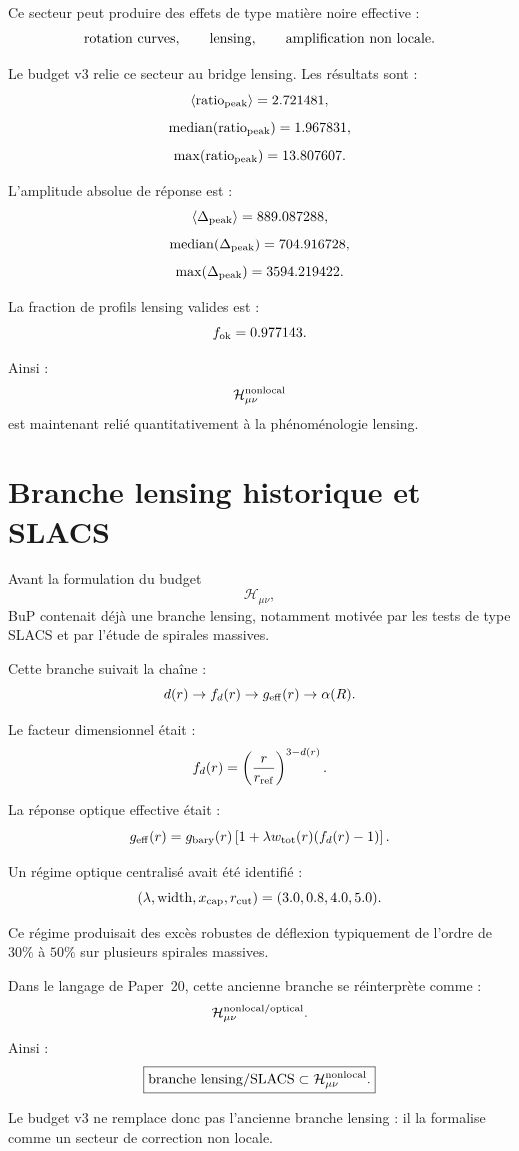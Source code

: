 \documentclass[11pt,a4paper]{article}
\begin{document}
Ce secteur peut produire des effets de type matière noire effective :
\[
{\rm rotation\ curves},
\qquad
{\rm lensing},
\qquad
{\rm amplification\ non\ locale}.
\]

Le budget v3 relie ce secteur au bridge lensing. Les résultats sont :
\[
\langle{\rm ratio}_{\rm peak}\rangle=2.721481,
\]
\[
{\rm median}({\rm ratio}_{\rm peak})=1.967831,
\]
\[
\max({\rm ratio}_{\rm peak})=13.807607.
\]

L'amplitude absolue de réponse est :
\[
\langle\Delta_{\rm peak}\rangle=889.087288,
\]
\[
{\rm median}(\Delta_{\rm peak})=704.916728,
\]
\[
\max(\Delta_{\rm peak})=3594.219422.
\]

La fraction de profils lensing valides est :
\[
f_{\rm ok}=0.977143.
\]

Ainsi :
\[
\mathcal{H}_{\mu\nu}^{\rm nonlocal}
\]
est maintenant relié quantitativement à la phénoménologie lensing.

\section{Branche lensing historique et SLACS}

Avant la formulation du budget
\[
\mathcal{H}_{\mu\nu},
\]
BuP contenait déjà une branche lensing, notamment motivée par les tests de
type SLACS et par l'étude de spirales massives.

Cette branche suivait la chaîne :
\[
d(r)
\to
f_d(r)
\to
g_{\rm eff}(r)
\to
\alpha(R).
\]

Le facteur dimensionnel était :
\[
f_d(r)
=
\left(
\frac{r}{r_{\rm ref}}
\right)^{3-d(r)}.
\]

La réponse optique effective était :
\[
g_{\rm eff}(r)
=
g_{\rm bary}(r)
\left[
1+
\lambda w_{\rm tot}(r)
(f_d(r)-1)
\right].
\]

Un régime optique centralisé avait été identifié :
\[
(\lambda,\mathrm{width},x_{\rm cap},r_{\rm cut})
=
(3.0,0.8,4.0,5.0).
\]

Ce régime produisait des excès robustes de déflexion typiquement de l'ordre
de \(30\%\) à \(50\%\) sur plusieurs spirales massives.

Dans le langage de Paper~20, cette ancienne branche se réinterprète comme :
\[
\mathcal{H}_{\mu\nu}^{\rm nonlocal/optical}.
\]

Ainsi :
\[
\boxed{
{\rm branche\ lensing/SLACS}
\subset
\mathcal{H}_{\mu\nu}^{\rm nonlocal}.
}
\]

Le budget v3 ne remplace donc pas l'ancienne branche lensing : il la formalise
comme un secteur de correction non locale.
\end{document}
